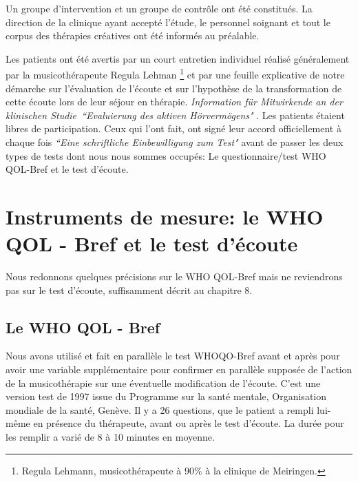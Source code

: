 Un groupe d'intervention et un groupe de contrôle ont été constitués.
La direction de la clinique ayant accepté l'étude, le personnel soignant et tout le
corpus des thérapies créatives ont  été
informés au préalable.

Les patients ont été avertis par un
court entretien individuel réalisé généralement par la musicothérapeute Regula Lehman  \footnote{Regula
  Lehmann, musicothérapeute  à 90\%  à la clinique de Meiringen.} et par  une
feuille explicative de notre démarche sur  l'évaluation de l'écoute et
sur
l'hypothèse de la transformation de cette écoute lors de leur 
séjour en thérapie. \emph{Information für Mitwirkende an der klinischen
  Studie\  ``Evaluierung des aktiven Hörvermögens" }.
Les patients étaient libres de participation. Ceux qui
l'ont fait, ont signé leur accord  officiellement à chaque fois  \emph{``Eine schriftliche Einbewilligung zum
Test"} avant de passer les deux types de tests dont nous nous sommes
occupés: Le questionnaire/test WHO QOL-Bref et le test d'écoute.

 
 
 

\section{Instruments de mesure: le WHO QOL - Bref et le test d'écoute}
 Nous redonnons quelques précisions sur le WHO QOL-Bref mais ne
 reviendrons pas sur le test d'écoute, suffisamment décrit au chapitre 8.

\subsection{Le WHO QOL - Bref}

Nous avons utilisé et fait en parallèle le test WHOQO-Bref avant et
après pour avoir une variable supplémentaire pour confirmer en
parallèle supposée de l'action de la musicothérapie sur une éventuelle modification de l'écoute.  C'est une
version test de 1997 issue du Programme sur la santé mentale,
Organisation mondiale de la santé, Genève. Il y a 26 questions, que le
patient a rempli lui-même en présence du thérapeute, avant ou après le test
d'écoute. La durée pour les remplir a varié de 8 à 10 minutes en
moyenne. 

